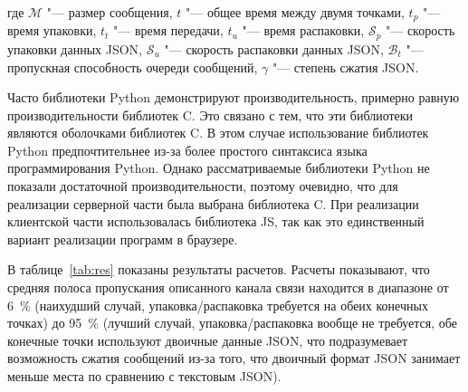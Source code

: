 \noindent где ${\mathcal{M}}$ "--- размер сообщения, $t$ "--- общее время между двумя точками, $t_p$ "--- время упаковки, $t_t$ "--- время передачи, $t_u$ "--- время распаковки, $\mathcal{S}_p$ "--- скорость упаковки данных JSON, $\mathcal{S}_u$ "--- скорость распаковки данных JSON, $\mathcal{B}_t$ "--- пропускная способность очереди сообщений, $\gamma$ "--- степень сжатия JSON.

Часто библиотеки Python демонстрируют производительность, примерно равную производительности библиотек C. Это связано с тем, что эти библиотеки являются оболочками библиотек C. В этом случае использование библиотек Python предпочтительнее из-за более простого синтаксиса языка программирования Python. Однако рассматриваемые библиотеки Python не показали достаточной производительности, поэтому очевидно, что для реализации серверной части была выбрана библиотека C. При реализации клиентской части использовалась библиотека JS, так как это единственный вариант реализации программ в браузере.

В таблице~\cref{tab:res} показаны результаты расчетов. Расчеты показывают, что средняя полоса пропускания описанного канала связи находится в диапазоне от \SI{6}{\percent} (наихудший случай, упаковка/распаковка требуется на обеих конечных точках) до \SI{95}{\percent} (лучший случай, упаковка/распаковка вообще не требуется, обе конечные точки используют двоичные данные JSON, что подразумевает возможность сжатия сообщений из-за того, что двоичный формат JSON занимает меньше места по сравнению с текстовым JSON).

